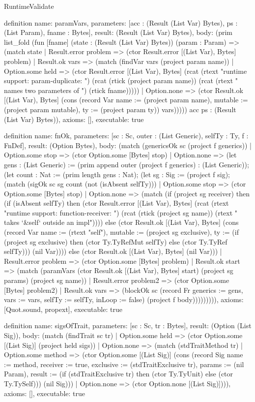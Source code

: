 \begin{lexlean}{RuntimeValidate}
\begin{semanticmodule}
definition{
  name: paramVars,
  parameters: [acc : (Result (List Var) Bytes), ps : (List Param), fname : Bytes],
  result: (Result (List Var) Bytes),
  body: (prim list_fold (fun [fname] (state : (Result (List Var) Bytes)) (param : Param) => (match state
    | Result.error problem => (ctor Result.error [(List Var), Bytes] problem)
    | Result.ok vars => (match (findVar vars (project param name))
      | Option.some held => (ctor Result.error [(List Var), Bytes] (rcat (rtext "runtime support: param-duplicate: ") (rcat (rtick (project param name)) (rcat (rtext " names two parameters of ") (rtick fname)))))
      | Option.none => (ctor Result.ok [(List Var), Bytes] (cons (record Var {name := (project param name), mutable := (project param mutable), ty := (project param ty)}) vars))))) acc ps : (Result (List Var) Bytes)),
  axioms: [],
  executable: true
}

definition{
  name: fnOk,
  parameters: [sc : Sc, outer : (List Generic), selfTy : Ty, f : FnDef],
  result: (Option Bytes),
  body: (match (genericsOk sc (project f generics))
    | Option.some stop => (ctor Option.some [Bytes] stop)
    | Option.none => (let gens : (List Generic) := (prim append outer (project f generics) : (List Generic)); (let count : Nat := (prim length gens : Nat); (let sg : Sig := (project f sig); (match (sigOk sc sg count (not (isAbsent selfTy)))
      | Option.some stop => (ctor Option.some [Bytes] stop)
      | Option.none => (match (if (project sg receiver) then (if (isAbsent selfTy) then (ctor Result.error [(List Var), Bytes] (rcat (rtext "runtime support: function-receiver: ") (rcat (rtick (project sg name)) (rtext " takes `&self` outside an impl")))) else (ctor Result.ok [(List Var), Bytes] (cons (record Var {name := (rtext "self"), mutable := (project sg exclusive), ty := (if (project sg exclusive) then (ctor Ty.TyRefMut selfTy) else (ctor Ty.TyRef selfTy))}) (nil Var)))) else (ctor Result.ok [(List Var), Bytes] (nil Var)))
        | Result.error problem => (ctor Option.some [Bytes] problem)
        | Result.ok start => (match (paramVars (ctor Result.ok [(List Var), Bytes] start) (project sg params) (project sg name))
          | Result.error problem2 => (ctor Option.some [Bytes] problem2)
          | Result.ok vars => (blockOk sc (record Fr {generics := gens, vars := vars, selfTy := selfTy, inLoop := false}) (project f body))))))))),
  axioms: [Quot.sound, propext],
  executable: true
}

definition{
  name: sigsOfTrait,
  parameters: [sc : Sc, tr : Bytes],
  result: (Option (List Sig)),
  body: (match (findTrait sc tr)
    | Option.some held => (ctor Option.some [(List Sig)] (project held sigs))
    | Option.none => (match (stdTraitMethod tr)
      | Option.some method => (ctor Option.some [(List Sig)] (cons (record Sig {name := method, receiver := true, exclusive := (stdTraitExclusive tr), params := (nil Param), result := (if (stdTraitExclusive tr) then (ctor Ty.TyUnit) else (ctor Ty.TySelf))}) (nil Sig)))
      | Option.none => (ctor Option.none [(List Sig)]))),
  axioms: [],
  executable: true
}


\end{semanticmodule}
\end{lexlean}
